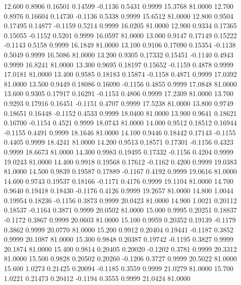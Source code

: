   12.600   0.8906   0.16501   0.14599  -0.1136   0.5431   0.9999  15.3768  81.0000
  12.700   0.8976   0.16604   0.14730  -0.1136   0.5338   0.9999  15.6512  81.0000
  12.800   0.9504   0.17495   0.14877  -0.1159   0.5214   0.9999  16.0205  81.0000
  12.900   0.9334   0.17365   0.15055  -0.1152   0.5201   0.9999  16.0597  81.0000
  13.000   0.9147   0.17149   0.15222  -0.1143   0.5158   0.9999  16.1849  81.0000
  13.100   0.9106   0.17090   0.15354  -0.1138   0.5049   0.9999  16.5086  81.0000
  13.200   0.9305   0.17332   0.15451  -0.1140   0.4943   0.9999  16.8241  81.0000
  13.300   0.9695   0.18197   0.15652  -0.1159   0.4878   0.9999  17.0181  81.0000
  13.400   0.9585   0.18183   0.15874  -0.1158   0.4871   0.9999  17.0392  81.0000
  13.500   0.9449   0.18086   0.16090  -0.1156   0.4855   0.9999  17.0848  81.0000
  13.600   0.9305   0.17917   0.16291  -0.1153   0.4806   0.9999  17.2309  81.0000
  13.700   0.9293   0.17916   0.16451  -0.1151   0.4707   0.9999  17.5238  81.0000
  13.800   0.9749   0.18651   0.16448  -0.1152   0.4533   0.9999  18.0400  81.0000
  13.900   0.9641   0.18621   0.16700  -0.1154   0.4521   0.9999  18.0743  81.0000
  14.000   0.9512   0.18512   0.16944  -0.1155   0.4491   0.9999  18.1646  81.0000
  14.100   0.9446   0.18442   0.17143  -0.1155   0.4405   0.9999  18.4241  81.0000
  14.200   0.9513   0.18571   0.17301  -0.1156   0.4323   0.9999  18.6673  81.0000
  14.300   0.9983   0.19495   0.17332  -0.1156   0.4204   0.9999  19.0243  81.0000
  14.400   0.9918   0.19568   0.17612  -0.1162   0.4200   0.9999  19.0383  81.0000
  14.500   0.9839   0.19587   0.17889  -0.1167   0.4192   0.9999  19.0616  81.0000
  14.600   0.9743   0.19537   0.18166  -0.1171   0.4176   0.9999  19.1104  81.0000
  14.700   0.9640   0.19418   0.18430  -0.1176   0.4126   0.9999  19.2657  81.0000
  14.800   1.0044   0.19954   0.18236  -0.1156   0.3873   0.9999  20.0423  81.0000
  14.900   1.0021   0.20112   0.18537  -0.1164   0.3871   0.9999  20.0502  81.0000
  15.000   0.9995   0.20251   0.18837  -0.1172   0.3867   0.9999  20.0603  81.0000
  15.100   0.9959   0.20352   0.19139  -0.1179   0.3862   0.9999  20.0770  81.0000
  15.200   0.9912   0.20404   0.19441  -0.1187   0.3852   0.9999  20.1087  81.0000
  15.300   0.9848   0.20387   0.19742  -0.1195   0.3827   0.9999  20.1874  81.0000
  15.400   0.9814   0.20405   0.20020  -0.1202   0.3781   0.9999  20.3312  81.0000
  15.500   0.9828   0.20502   0.20260  -0.1206   0.3727   0.9999  20.5022  81.0000
  15.600   1.0273   0.21425   0.20094  -0.1185   0.3559   0.9999  21.0279  81.0000
  15.700   1.0221   0.21473   0.20412  -0.1194   0.3555   0.9999  21.0424  81.0000
